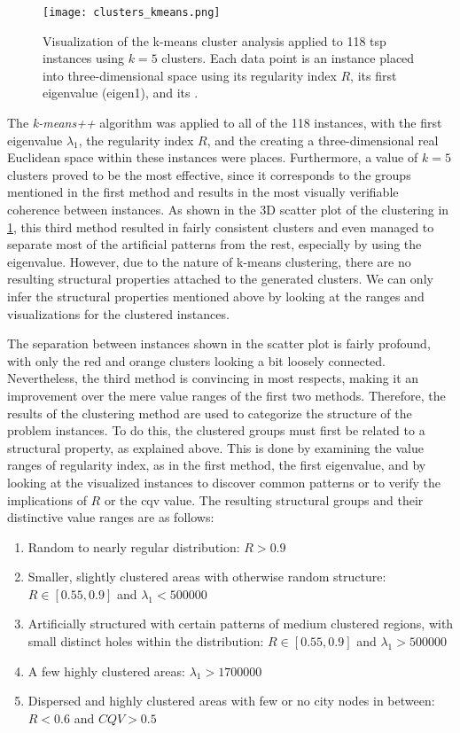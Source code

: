 \begin{figure}
	\centering
	\texttt{[image: clusters\_kmeans.png]}
	\caption[Visualization of the k-means cluster analysis]{Visualization of the k-means cluster analysis applied to 118 \gls{tsp} instances using $k=5$ clusters. Each data point is an instance placed into three-dimensional space using its regularity index $R$, its first eigenvalue (eigen1), and its .}
	\label{fig:clusters-kmeans}
\end{figure}

The \textit{k-means++} algorithm was applied to all of the 118 instances, with the first eigenvalue $\lambda_1$, the regularity index $R$, and the  creating a three-dimensional real Euclidean space within these instances were places. Furthermore, a value of $k = 5$ clusters proved to be the most effective, since it corresponds to the groups mentioned in the first method and results in the most visually verifiable coherence between instances. As shown in the 3D scatter plot of the clustering in \cref{fig:clusters-kmeans}, this third method resulted in fairly consistent clusters and even managed to separate most of the artificial patterns from the rest, especially by using the eigenvalue. However, due to the nature of k-means clustering, there are no resulting structural properties attached to the generated clusters. We can only infer the structural properties mentioned above by looking at the ranges and visualizations for the clustered instances.
 
 The separation between instances shown in the scatter plot is fairly profound, with only the red and orange clusters looking a bit loosely connected. Nevertheless, the third method is convincing in most respects, making it an improvement over the mere value ranges of the first two methods. Therefore, the results of the clustering method are used to categorize the structure of the problem instances. To do this, the clustered groups must first be related to a structural property, as explained above. This is done by examining the value ranges of regularity index, as in the first method, the first eigenvalue, and by looking at the visualized instances to discover common patterns or to verify the implications of $R$ or the \gls{cqv} value. The resulting structural groups and their distinctive value ranges are as follows:
 
 \begin{enumerate}
 	\item Random to nearly regular distribution: $R > 0.9$
 	\item Smaller, slightly clustered areas with otherwise random structure: $R \in [0.55, 0.9]$ and $\lambda_1 < 500 000$
 	\item Artificially structured with certain patterns of medium clustered regions, with small distinct holes within the distribution: $R \in [0.55, 0.9]$ and $\lambda_1 > 500 000$
 	\item A few highly clustered areas: $\lambda_1 > 1 700 000$
 	\item Dispersed and highly clustered areas with few or no city nodes in between: $R < 0.6$ and $CQV > 0.5$ \end{enumerate}

